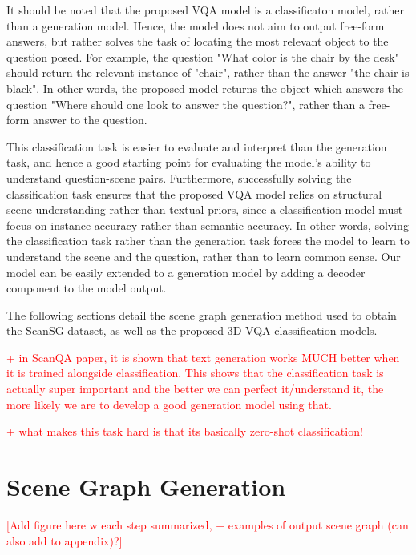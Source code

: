 It should be noted that the proposed VQA model is a classificaton model, rather than a generation model. Hence, the model does not aim to output free-form answers, but rather solves the task of locating the most relevant object to the question posed. For example, the question "What color is the chair by the desk" should return the relevant instance of "chair", rather than the answer "the chair is black".
In other words, the proposed model returns the object which answers the question "Where should one look to answer the question?", rather than a free-form answer to the question.

This classification task is easier to evaluate and interpret than the generation task, and hence a good starting point for evaluating the model's ability to understand question-scene pairs. Furthermore, successfully solving the classification task ensures that the proposed VQA model relies on structural scene understanding rather than textual priors, since a classification model must focus on instance accuracy rather than semantic accuracy. In other words, solving the classification task rather than the generation task forces the model to learn to understand the scene and the question, rather than to learn common sense. Our model can be easily extended to a generation model by adding a decoder component to the model output.

The following sections detail the scene graph generation method used to obtain the ScanSG dataset, as well as the proposed 3D-VQA classification models.

\textcolor{red}{+ in ScanQA paper, it is shown that text generation works MUCH better when it is trained alongside classification. This shows that the classification task is actually super important and the better we can perfect it/understand it, the more likely we are to develop a good generation model using that.} 

\textcolor{red}{+ what makes this task hard is that its basically zero-shot classification!}

\section{Scene Graph Generation}

\textcolor{red}{[Add figure here w each step summarized, + examples of output scene graph (can also add to appendix)?]}

